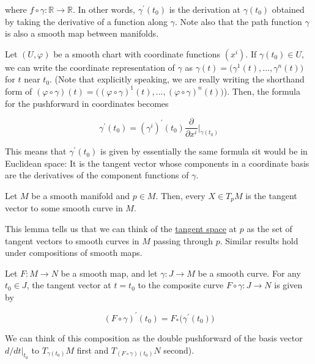 \documentclass{article}
\newcounter{theorem}[section]
\begin{document}
    where $f \circ \gamma: \mathbb{R} \to \mathbb{R}$. In other words, $\gamma^\prime (t_0)$ is the derivation at $\gamma(t_0)$ obtained by taking the derivative of a function along $\gamma$. Note also that the path function $\gamma$ is also a smooth map between manifolds. 

    Let $(U, \varphi)$ be a smooth chart with coordinate functions $(x^i)$. If $\gamma(t_0) \in U$, we can write the coordinate representation of $\gamma$ as $\gamma(t) = \big( \gamma^1 (t), ..., \gamma^n (t)\big)$ for $t$ near $t_0$. (Note that explicitly speaking, we are really writing the shorthand form of $(\varphi \circ \gamma) (t) = \big( (\varphi \circ \gamma)^1 (t), ..., (\varphi \circ \gamma)^n (t)\big)$). Then, the formula  for the pushforward in coordinates becomes 

      \begin{equation}
        \gamma^\prime (t_0) = (\gamma^i)^\prime (t_0) \frac{\partial}{\partial x^i} \bigg|_{\gamma(t_0)}
      \end{equation}

    This means that $\gamma^\prime (t_0)$ is given by essentially the same formula sit would be in Euclidean space: It is the tangent vector whose components in a coordinate basis are the derivatives of the component functions of $\gamma$. 

    \begin{lemma}
      \label{thm:every-tangent-vector-is-tangent-to-a-curve}
      Let $M$ be a smooth manifold and $p \in M$. Then, every $X \in T_p M$ is the tangent vector to some smooth curve in $M$. 
    \end{lemma}

    This lemma tells us that we can think of the \hyperref[mv-def:tangent-space]{tangent space} at $p$ as the set of tangent vectors to smooth curves in $M$ passing through $p$. Similar results hold under compositions of smooth maps. 

    \begin{theorem}
      \label{thm:pushforward-of-a-velocity-vector}
      Let $F: M \to N$ be a smooth map, and let $\gamma: J \to M$ be a smooth curve. For any $t_0 \in J$, the tangent vector at $t = t_0$ to the composite curve $F \circ \gamma: J \to N$ is given by 

        \begin{equation}
          (F \circ \gamma)^\prime (t_0) = F_* \big( \gamma^\prime (t_0) \big)
        \end{equation}

      We can think of this composition as the double pushforward of the basis vector $d/dt \big|_{t_0}$ to $T_{\gamma(t_0)} M$ first and $T_{(F \circ \gamma)(t_0)} N$ second). 
    \end{theorem}
\end{document}
